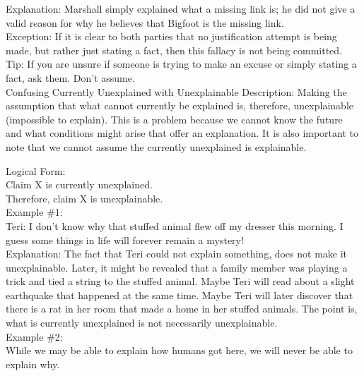 \documentclass[a4paper,12pt,single,pdftex]{scrartcl}
\begin{document}
    
      Explanation: Marshall simply explained what a missing link is; he did not give a valid reason for why he believes that Bigfoot is the missing link.
    \\

    
      Exception: If it is clear to both parties that no justification attempt is being made, but rather just stating a fact, then this fallacy is not being committed.
    \\

    
      Tip: If you are unsure if someone is trying to make an excuse or simply stating a fact, ask them.  Don’t assume.
    \\

  

Confusing Currently Unexplained with Unexplainable
    Description: Making the assumption that what cannot currently be explained is, therefore, unexplainable (impossible to explain). This is a problem because we cannot know the future and what conditions might arise that offer an explanation. It is also important to note that we cannot assume the currently unexplained is explainable.

    
      Logical Form:
    \\

    
      Claim X is currently unexplained.
    \\

    
      Therefore, claim X is unexplainable.
    \\

    
      Example \#1:
    \\

    
      Teri: I don't know why that stuffed animal flew off my dresser this morning. I guess some things in life will forever remain a mystery!
    \\

    
      Explanation: The fact that Teri could not explain something, does not make it unexplainable. Later, it might be revealed that a family member was playing a trick and tied a string to the stuffed animal. Maybe Teri will read about a slight earthquake that happened at the same time. Maybe Teri will later discover that there is a rat in her room that made a home in her stuffed animals. The point is, what is currently unexplained is not necessarily unexplainable.
    \\

    
      Example \#2:
    \\

    
      While we may be able to explain how humans got here, we will never be able to explain why.
    \\
\end{document}

